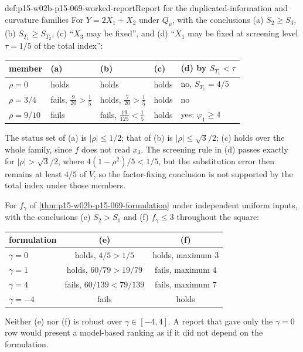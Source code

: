 \begin{hbexample}{def:p15-w02b-p15-069-worked-report}{Report for the duplicated-information and curvature families}
For \(Y=2X_1+X_2\) under \(Q_\rho\), with the conclusions
(a) \(S_2\geq S_3\), (b) \(S_{T_1}\geq S_{T_2}\),
(c) ``\(X_3\) may be fixed'', and (d) ``\(X_1\) may be fixed at
screening level \(\tau=1/5\) of the total index'':
\begin{center}
\begin{tabular}{lllll}
 member & (a) & (b) & (c) & (d) by \(S_{T_1}<\tau\)\\\hline
 \(\rho=0\) & holds & holds & holds & no, \(S_{T_1}=4/5\)\\
 \(\rho=3/4\) & fails, \(\frac9{20}>\frac15\) & holds, \(\frac7{20}>\frac15\) & holds & no\\
 \(\rho=9/10\) & fails & fails, \(\frac{19}{125}<\frac15\) & holds & yes; \(\varphi_1\geq4\)
\end{tabular}
\end{center}
The status set of (a) is \(|\rho|\leq1/2\); that of (b) is
\(|\rho|\leq\sqrt3/2\); (c) holds over the whole family, since \(f\) does not
read \(x_3\). The screening rule in (d) passes exactly for
\(|\rho|>\sqrt3/2\), where \(4(1-\rho^2)/5<1/5\), but the substitution
error then remains at least \(4/5\) of \(V\), so the factor-fixing
conclusion is not supported by the total index under those members.

For \(f_\gamma\) of \cref{thm:p15-w02b-p15-069-formulation} under independent
uniform inputs, with the conclusions (e) \(S_2>S_1\) and (f)
\(f_\gamma\leq3\) throughout the square:
\begin{center}
\begin{tabular}{lcc}
 formulation & (e) & (f)\\\hline
 \(\gamma=0\) & holds, \(4/5>1/5\) & holds, maximum \(3\)\\
 \(\gamma=1\) & holds, \(60/79>19/79\) & fails, maximum \(4\)\\
 \(\gamma=4\) & fails, \(60/139<79/139\) & fails, maximum \(7\)\\
 \(\gamma=-4\) & fails & holds
\end{tabular}
\end{center}
Neither (e) nor (f) is robust over \(\gamma\in[-4,4]\). A report that gave
only the \(\gamma=0\) row would present a model-based ranking as if it did
not depend on the formulation.
\end{hbexample}

